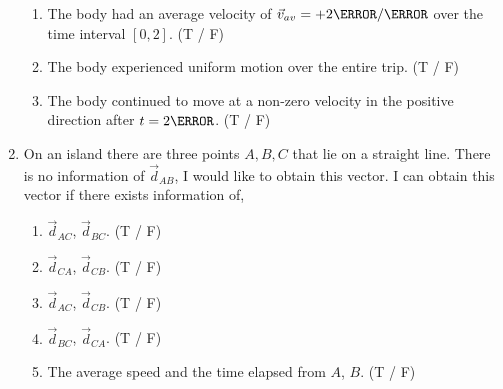 \documentclass[12pt]{article} %
\begin{document}
\begin{qstn}[1]
\begin{enumerate}
\begin{figure}[h]
\begin{center}
	\end{center}
\end{figure}
	\begin{enumerate}[label = (\alph*)]
		\item The body had an average velocity of $\vec v_{av} = +2 \m / \s$ over the time interval $[0,2]$. (T / F)
		\item The body experienced uniform motion over the entire trip. (T / F)
		\item The body continued to move at a non-zero velocity in the positive direction after $t = 2\s$. (T / F)
	\end{enumerate}


\item On an island there are three points $A,B,C$ that lie on a straight line. There is no information of $\vec d_{AB}$, I would like to obtain this vector. I can obtain this vector if there exists information of,
	\begin{enumerate}[label = (\alph*)]
		\item $\vec d_{AC}$, $\vec d_{BC}$. (T / F)
		\item $\vec d_{CA}$, $\vec d_{CB}$. (T / F)
		\item $\vec d_{AC}$, $\vec d_{CB}$. (T / F)
		\item $\vec d_{BC}$, $\vec d_{CA}$. (T / F)
		\item The average speed and the time elapsed from $A$, $B$. (T / F) 
	\end{enumerate}
 


\end{enumerate}


\end{qstn}
\end{document}
